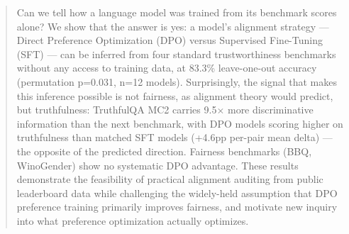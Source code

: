 \begin{abstract}
Can we tell how a language model was trained from its benchmark scores alone?
We show that the answer is yes: a model's alignment strategy --- Direct Preference
Optimization (DPO) versus Supervised Fine-Tuning (SFT) --- can be inferred from four
standard trustworthiness benchmarks without any access to training data, at 83.3\%
leave-one-out accuracy (permutation p=0.031, n=12 models). Surprisingly, the
signal that makes this inference possible is not fairness, as alignment theory
would predict, but truthfulness: TruthfulQA MC2 carries 9.5$\times$ more discriminative
information than the next benchmark, with DPO models scoring higher on truthfulness than matched SFT models
(+4.6pp per-pair mean delta) --- the opposite of the predicted direction. Fairness
benchmarks (BBQ, WinoGender) show no systematic DPO advantage. These results
demonstrate the feasibility of practical alignment auditing from public leaderboard
data while challenging the widely-held assumption that DPO preference training
primarily improves fairness, and motivate new inquiry into what preference
optimization actually optimizes.
\end{abstract}
